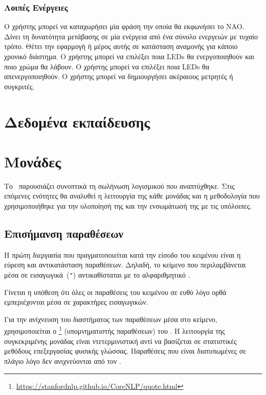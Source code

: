 \subsubsection{Λοιπές Ενέργειες}
\begin{compactitem}
     Ο χρήστης μπορεί να καταχωρήσει μία φράση την οποία θα εκφωνήσει το NAO.
     Δίνει τη δυνατότητα μετάβασης σε μία ενέργεια από ένα σύνολο ενεργειών με τυχαίο τρόπο.
     Θέτει την εφαρμογή ή μέρος αυτής σε κατάσταση αναμονής για κάποιο χρονικό διάστημα.
     Ο χρήστης μπορεί να επιλέξει ποια LEDs θα ενεργοποιηθούν και ποιο χρώμα θα λάβουν.
     Ο χρήστης μπορεί να επιλέξει ποια LEDs θα απενεργοποιηθούν.
     Ο χρήστης μπορεί να δημιουργήσει ακέραιους μετρητές ή συγκριτές.
\end{compactitem}

\section{Δεδομένα εκπαίδευσης} %

\section{Μονάδες} %
Το~ παρουσιάζει συνοπτικά τη σωλήνωση λογισμικού που αναπτύχθηκε.
Στις επόμενες ενότητες θα αναλυθεί η λειτουργία της κάθε μονάδας και η μεθοδολογία που χρησιμοποιήθηκε για την υλοποίησή της και την ενσωμάτωσή της με τις υπόλοιπες.

\subsection{Επισήμανση παραθέσεων}\label{subsec:4-QuoteAnnotator}
\newcommand{\QUOTESTRING}{\engquote{\texttt{QUOTE}}}
Η πρώτη διεργασία που πραγματοποιείται κατά την είσοδο του κειμένου είναι η εύρεση και αντικατάσταση παραθέσεων.
Δηλαδή, το κείμενο που περιλαμβάνεται μέσα σε εισαγωγικά~(\texttt{"}) αντικαθίσταται με το αλφαριθμητικό \QUOTESTRING{}.

Γίνεται η υπόθεση ότι όλες οι παραθέσεις του κειμένου σε ευθύ λόγο ορθά εμπεριέχονται μέσα σε χαρακτήρες εισαγωγικών.

Για την ανίχνευση του διαστήματος των παραθέσεων μέσα στο κείμενο, χρησιμοποιείται ο \footnote{\url{https://stanfordnlp.github.io/CoreNLP/quote.html}} (υπομνηματιστής παραθέσεων) του .
Η λειτουργία της συγκεκριμένης μονάδας είναι ντετερμινιστική αντί να βασίζεται σε στατιστικές μεθόδους επεξεργασίας φυσικής γλώσσας.
Παραθέσεις που είναι διατυπωμένες σε πλάγιο λόγο δεν ανιχνεύονται από τον .

